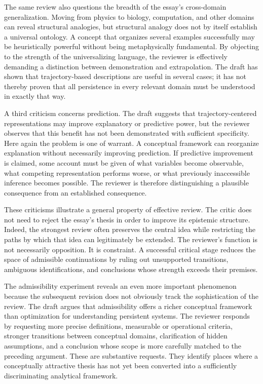 \documentclass[11pt]{article}
\begin{document}
The same review also questions the breadth of the essay's cross-domain generalization. Moving from physics to biology, computation, and other domains can reveal structural analogies, but structural analogy does not by itself establish a universal ontology. A concept that organizes several examples successfully may be heuristically powerful without being metaphysically fundamental. By objecting to the strength of the universalizing language, the reviewer is effectively demanding a distinction between demonstration and extrapolation. The draft has shown that trajectory-based descriptions are useful in several cases; it has not thereby proven that all persistence in every relevant domain must be understood in exactly that way.

A third criticism concerns prediction. The draft suggests that trajectory-centered representations may improve explanatory or predictive power, but the reviewer observes that this benefit has not been demonstrated with sufficient specificity. Here again the problem is one of warrant. A conceptual framework can reorganize explanation without necessarily improving prediction. If predictive improvement is claimed, some account must be given of what variables become observable, what competing representation performs worse, or what previously inaccessible inference becomes possible. The reviewer is therefore distinguishing a plausible consequence from an established consequence.

These criticisms illustrate a general property of effective review. The critic does not need to reject the essay's thesis in order to improve its epistemic structure. Indeed, the strongest review often preserves the central idea while restricting the paths by which that idea can legitimately be extended. The reviewer's function is not necessarily opposition. It is constraint. A successful critical stage reduces the space of admissible continuations by ruling out unsupported transitions, ambiguous identifications, and conclusions whose strength exceeds their premises.

The admissibility experiment reveals an even more important phenomenon because the subsequent revision does not obviously track the sophistication of the review. The draft argues that admissibility offers a richer conceptual framework than optimization for understanding persistent systems. The reviewer responds by requesting more precise definitions, measurable or operational criteria, stronger transitions between conceptual domains, clarification of hidden assumptions, and a conclusion whose scope is more carefully matched to the preceding argument. These are substantive requests. They identify places where a conceptually attractive thesis has not yet been converted into a sufficiently discriminating analytical framework.
\end{document}
